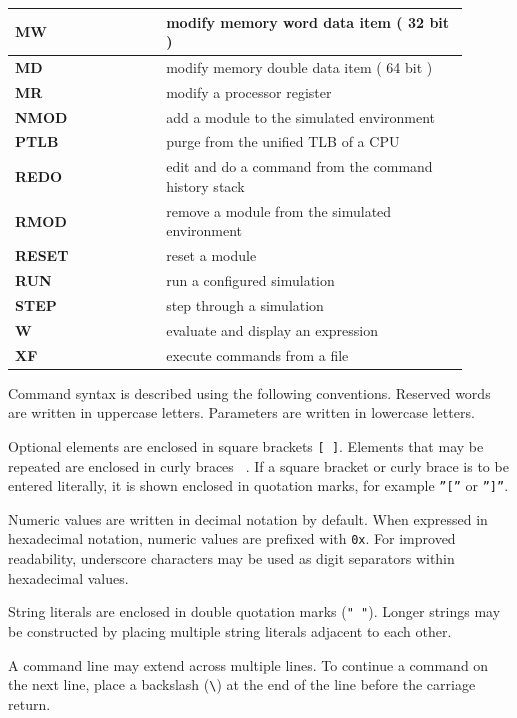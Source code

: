 \begin{longtable}{@{}p{0.3\linewidth}p{0.6\linewidth}@{}}
	\midrule
	\textbf{MW} & modify memory word data item ( 32 bit )\\
	\midrule
	\textbf{MD} & modify memory double data item ( 64 bit )\\
	\midrule
	\textbf{MR} & modify a processor register \\
	\midrule
	\textbf{NMOD} & add a module to the simulated environment \\
	\midrule
	\textbf{PTLB} & purge from the unified TLB of a CPU \\
	\midrule
	\textbf{REDO} & edit and do a command from the command history stack \\
	\midrule
	\textbf{RMOD} & remove a module from the simulated environment \\
	\midrule
	\textbf{RESET} & reset a module \\
	\midrule
	\textbf{RUN} & run a configured simulation \\
	\midrule
	\textbf{STEP} & step through a simulation\\
	\midrule
	\textbf{W} & evaluate and display an expression \\
	\midrule
	\textbf{XF} & execute commands from a file \\
	\end{longtable}
	


Command syntax is described using the following conventions. Reserved words are written in uppercase letters. Parameters are written in lowercase letters.

Optional elements are enclosed in square brackets \texttt{[ ]}. Elements that may be repeated are enclosed in curly braces \texttt{{ }}. If a square bracket or curly brace is to be entered literally, it is shown enclosed in quotation marks, for example \texttt{”[”} or \texttt{”]”}.

Numeric values are written in decimal notation by default. When expressed in hexadecimal notation, numeric values are prefixed with \texttt{0x}. For improved readability, underscore characters may be used as digit separators within hexadecimal values.

String literals are enclosed in double quotation marks (\texttt{" "}). Longer strings may be constructed by placing multiple string literals adjacent to each other.

A command line may extend across multiple lines. To continue a command on the next line, place a backslash (\texttt{\textbackslash}) at the end of the line before the carriage return.

